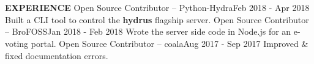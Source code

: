 \documentclass[a4paper, 12pt]{article}
\begin{document}
\section*{}
\begin{vwcol}[widths={0.2, 0.8}, justify=flush, sep=0.7cm, rule=0pt, indent=1em]
\large{\textbf{\textcolor{uclagold}{EXPERIENCE}}}\newline\newline\newline\newline\newline\newline\newline\newline\newline\newline\newline
\large{Open Source Contributor -- \textcolor{frenchblue}{Python-Hydra}}\hspace{3cm}\tiny{Feb 2018 - Apr 2018}\vspace{-0.05cm}\newline
\small{Built a CLI tool to control the \textbf{hydrus} flagship server.}\vspace{0.2cm}\newline
\large{Open Source Contributor -- \textcolor{frenchblue}{BroFOSS}}\hspace{4.1cm}\tiny{Jan 2018 - Feb 2018}\vspace{-0.05cm}\newline
\small{Wrote the server side code in Node.js for an e-voting portal.}\vspace{0.2cm}\newline
\large{Open Source Contributor -- \textcolor{frenchblue}{coala}}\hspace{5cm}\tiny{Aug 2017 - Sep 2017}\vspace{-0.05cm}\newline
\small{Improved \& fixed documentation errors.}\vspace{0.2cm}\normalsize
\end{vwcol}

\vspace{-3cm}
\end{document}
